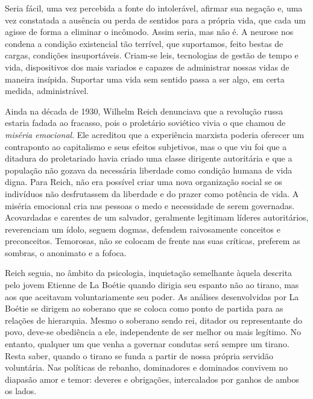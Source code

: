 Seria fácil, uma vez percebida a fonte do intolerável, afirmar sua
negação e, uma vez constatada a ausência ou perda de sentidos para a
própria vida, que cada um agisse de forma a eliminar o incômodo. Assim
seria, mas não é. A neurose nos condena a condição existencial tão
terrível, que suportamos, feito bestas de cargas, condições
insuportáveis. Criam-se leis, tecnologias de gestão de tempo e vida,
dispositivos dos mais variados e capazes de administrar nossas vidas de
maneira insípida. Suportar uma vida sem sentido passa a ser algo, em
certa medida, administrável.

Ainda na década de 1930, Wilhelm Reich denunciava que a revolução russa
estaria fadada ao fracasso, pois o proletário soviético vivia o que
chamou de \emph{miséria emocional}. Ele acreditou que a experiência
marxista poderia oferecer um contraponto ao capitalismo e seus efeitos
subjetivos, mas o que viu foi que a ditadura do proletariado havia
criado uma classe dirigente autoritária e que a população não gozava da
necessária liberdade como condição humana de vida digna. Para Reich, não
era possível criar uma nova organização social se os indivíduos não
desfrutassem da liberdade e do prazer como potência de vida. A miséria
emocional cria nas pessoas o medo e necessidade de serem governadas.
Acovardadas e carentes de um salvador, geralmente legitimam líderes
autoritários, reverenciam um ídolo, seguem dogmas, defendem raivosamente
conceitos e preconceitos. Temorosas, não se colocam de frente nas suas
críticas, preferem as sombras, o anonimato e a fofoca.

Reich seguia, no âmbito da psicologia, inquietação semelhante àquela
descrita pelo jovem Etienne de La Boétie quando dirigia seu espanto não
ao tirano, mas aos que aceitavam voluntariamente seu poder. As análises
desenvolvidas por La Boétie se dirigem ao soberano que se coloca como
ponto de partida para as relações de hierarquia. Mesmo o soberano sendo
rei, ditador ou representante do povo, deve-se obediência a ele,
independente de ser melhor ou mais legítimo. No entanto, qualquer um que
venha a governar condutas será sempre um tirano. Resta saber, quando o
tirano se funda a partir de nossa própria servidão voluntária. Nas
políticas de rebanho, dominadores e dominados convivem no diapasão amor
e temor: deveres e obrigações, intercalados por ganhos de ambos os
lados.

